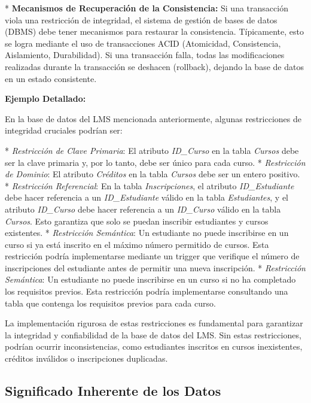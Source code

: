 *   \textbf{Mecanismos de Recuperación de la Consistencia:}  Si una transacción viola una restricción de integridad, el sistema de gestión de bases de datos (DBMS) debe tener mecanismos para restaurar la consistencia.  Típicamente, esto se logra mediante el uso de transacciones ACID (Atomicidad, Consistencia, Aislamiento, Durabilidad). Si una transacción falla, todas las modificaciones realizadas durante la transacción se deshacen (rollback), dejando la base de datos en un estado consistente.

\textbf{Ejemplo Detallado:}

En la base de datos del LMS mencionada anteriormente, algunas restricciones de integridad cruciales podrían ser:

*   \textit{Restricción de Clave Primaria}:  El atributo \textit{ID\_Curso} en la tabla \textit{Cursos} debe ser la clave primaria y, por lo tanto, debe ser único para cada curso.
*   \textit{Restricción de Dominio}:  El atributo \textit{Créditos} en la tabla \textit{Cursos} debe ser un entero positivo.
*   \textit{Restricción Referencial}:  En la tabla \textit{Inscripciones}, el atributo \textit{ID\_Estudiante} debe hacer referencia a un \textit{ID\_Estudiante} válido en la tabla \textit{Estudiantes}, y el atributo \textit{ID\_Curso} debe hacer referencia a un \textit{ID\_Curso} válido en la tabla \textit{Cursos}. Esto garantiza que solo se puedan inscribir estudiantes y cursos existentes.
*   \textit{Restricción Semántica}:  Un estudiante no puede inscribirse en un curso si ya está inscrito en el máximo número permitido de cursos. Esta restricción podría implementarse mediante un trigger que verifique el número de inscripciones del estudiante antes de permitir una nueva inscripción.
*   \textit{Restricción Semántica}:  Un estudiante no puede inscribirse en un curso si no ha completado los requisitos previos. Esta restricción podría implementarse consultando una tabla que contenga los requisitos previos para cada curso.

La implementación rigurosa de estas restricciones es fundamental para garantizar la integridad y confiabilidad de la base de datos del LMS. Sin estas restricciones, podrían ocurrir inconsistencias, como estudiantes inscritos en cursos inexistentes, créditos inválidos o inscripciones duplicadas.

\subsection{Significado Inherente de los Datos}

